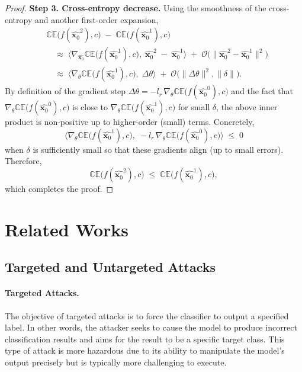 \begin{proof}
\medskip
\noindent
\textbf{Step 3. Cross-entropy decrease.}
Using the smoothness of the cross-entropy and another first-order expansion,
\[
\begin{aligned}
&\mathbb{CE}\bigl(f(\widehat{\mathbf{x}_0}^2), c\bigr) 
\;-\;
\mathbb{CE}\bigl(f(\widehat{\mathbf{x}_0}^1), c\bigr)
\\
&\quad\approx\;
\bigl\langle
\nabla_{\widehat{\mathbf{x}_0}}\!\mathbb{CE}\bigl(f(\widehat{\mathbf{x}_0}^1), c\bigr),
\;\widehat{\mathbf{x}_0}^2 \;-\;\widehat{\mathbf{x}_0}^1
\bigr\rangle
\;+\;
\mathcal{O}\bigl(\|\widehat{\mathbf{x}_0}^2 - \widehat{\mathbf{x}_0}^1\|^2\bigr)
\\
&\quad\approx\;
\bigl\langle
\nabla_{\theta}\mathbb{CE}\bigl(f(\widehat{\mathbf{x}_0}^1), c\bigr),
\;\Delta \theta
\bigr\rangle
\;+\;\mathcal{O}\bigl(\|\Delta\theta\|^2,\|\delta\|\bigr).
\end{aligned}
\]
By definition of the gradient step \(\Delta \theta = -l_r\,\nabla_\theta \mathbb{CE}\bigl(f(\widehat{\mathbf{x}_0}^0), c\bigr)\) and the fact that 
\(\nabla_\theta \mathbb{CE}\bigl(f(\widehat{\mathbf{x}_0}^0), c\bigr)\) is close to 
\(\nabla_\theta \mathbb{CE}\bigl(f(\widehat{\mathbf{x}_0}^1), c\bigr)\) for small \(\delta\), the above inner product is non-positive up to higher-order (small) terms. Concretely,
\[
\bigl\langle
\nabla_{\theta}\mathbb{CE}\bigl(f(\widehat{\mathbf{x}_0}^1), c\bigr),
\;-l_r\, \nabla_\theta \mathbb{CE}\bigl(f(\widehat{\mathbf{x}_0}^0), c\bigr)
\bigr\rangle
\;\le\; 0
\]
when \(\delta\) is sufficiently small so that these gradients align (up to small errors). Therefore,
\[
\mathbb{CE}\bigl(f(\widehat{\mathbf{x}_0}^2), c\bigr) 
\;\le\; 
\mathbb{CE}\bigl(f(\widehat{\mathbf{x}_0}^1), c\bigr),
\]
which completes the proof.
\end{proof}


\section{Related Works}

\subsection{Targeted and Untargeted Attacks}

\paragraph{Targeted Attacks.} The objective of targeted attacks is to force the classifier to output a specified label. In other words, the attacker seeks to cause the model to produce incorrect classification results and aims for the result to be a specific target class. This type of attack is more hazardous due to its ability to manipulate the model's output precisely but is typically more challenging to execute.

